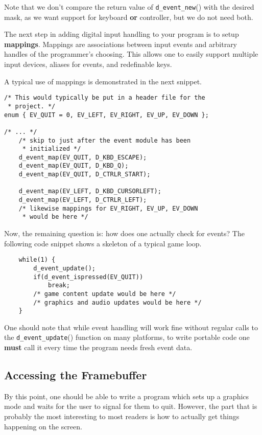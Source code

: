 Note that we don't compare the return value of {\tt d\_event\_new}()
with the desired mask, as we want support for keyboard {\bf or}
controller, but we do not need both.

The next step in adding digital input handling to your program is
to setup {\bf mappings}. Mappings are associations between input
events and arbitrary handles of the programmer's choosing. This
allows one to easily support multiple input devices, aliases for
events, and redefinable keys.

A typical use of mappings is demonstrated in the next snippet.

\begin{verbatim}
/* This would typically be put in a header file for the
 * project. */
enum { EV_QUIT = 0, EV_LEFT, EV_RIGHT, EV_UP, EV_DOWN };

/* ... */
    /* skip to just after the event module has been
     * initialized */
    d_event_map(EV_QUIT, D_KBD_ESCAPE);
    d_event_map(EV_QUIT, D_KBD_Q);
    d_event_map(EV_QUIT, D_CTRLR_START);

    d_event_map(EV_LEFT, D_KBD_CURSORLEFT);
    d_event_map(EV_LEFT, D_CTRLR_LEFT);
    /* likewise mappings for EV_RIGHT, EV_UP, EV_DOWN
     * would be here */
\end{verbatim}

Now, the remaining question is: how does one actually check for events?
The following code snippet shows a skeleton of a typical game loop.

\begin{verbatim}
    while(1) {
        d_event_update();
        if(d_event_ispressed(EV_QUIT))
            break;
        /* game content update would be here */
        /* graphics and audio updates would be here */
    }
\end{verbatim}

One should note that while event handling will work fine without regular
calls to the {\tt d\_event\_update}() function on many platforms, to write
portable code one {\bf must} call it every time the program needs fresh
event data.

\subsection{Accessing the Framebuffer}

By this point, one should be able to write a program which sets up a
graphics mode and waits for the user to signal for them to quit.
However, the part that is probably the most interesting to most
readers is how to actually get things happening on the screen.

